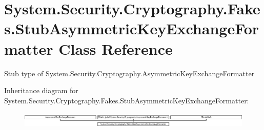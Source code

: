 \hypertarget{class_system_1_1_security_1_1_cryptography_1_1_fakes_1_1_stub_asymmetric_key_exchange_formatter}{\section{System.\-Security.\-Cryptography.\-Fakes.\-Stub\-Asymmetric\-Key\-Exchange\-Formatter Class Reference}
\label{class_system_1_1_security_1_1_cryptography_1_1_fakes_1_1_stub_asymmetric_key_exchange_formatter}
}


Stub type of System.\-Security.\-Cryptography.\-Asymmetric\-Key\-Exchange\-Formatter 


Inheritance diagram for System.\-Security.\-Cryptography.\-Fakes.\-Stub\-Asymmetric\-Key\-Exchange\-Formatter\-:\begin{figure}[H]
\begin{center}
\leavevmode
\includegraphics[height=0.771350cm]{class_system_1_1_security_1_1_cryptography_1_1_fakes_1_1_stub_asymmetric_key_exchange_formatter}
\end{center}
\end{figure}
